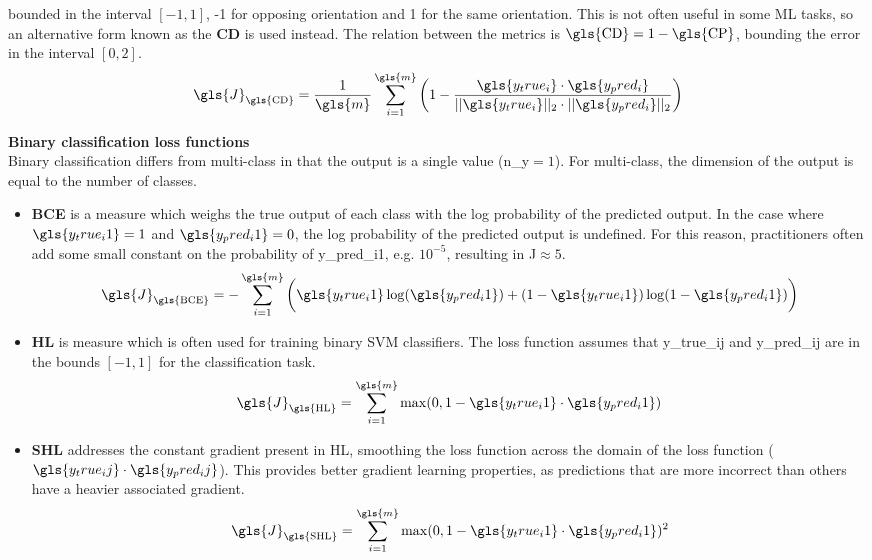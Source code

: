 \begin{itemize}
    bounded in the interval $[-1,1]$, -1 for opposing orientation and 1 for the
    same orientation. This is not often useful in some \gls{ML} tasks, so an
    alternative form known as the \textbf{\gls{CD}} is used instead. The
    relation between the metrics is $\text{\gls{CD}}=1-\text{\gls{CP}}$,
    bounding the error in the interval $[0,2]$.
    \begin{equation}
        \gls{J}_\text{\gls{CD}} =
        \frac{1}{\gls{m}}\sum_{i=1}^{\gls{m}}\bigg(1-\frac{\gls{y_true_i}\cdot{}\gls{y_pred_i}}{||\gls{y_true_i}||_2\cdot{}||\gls{y_pred_i}||_2}\bigg)
    \end{equation}
\end{itemize}

\textbf{Binary classification loss functions}\\
Binary classification differs from multi-class in that the output is a single
value (\gls{n_y}$=1$). For multi-class, the dimension of the output is equal to
the number of classes.

\begin{itemize}
    \item \textbf{\Gls{BCE}} is a measure which weighs the true output of each
    class with the log probability of the predicted output. In the case
    where $\gls{y_true_i1}=1$ and $\gls{y_pred_i1}=0$, the log probability of
    the predicted output is undefined. For this reason, practitioners often add
    some small constant on the probability of \gls{y_pred_i1}, e.g. $10^{-5}$,
    resulting in \gls{J}$\approx{}5$.
    \begin{equation}
        \gls{J}_\text{\gls{BCE}}=-\sum_{i=1}^{\gls{m}}\bigg(\gls{y_true_i1}\log(\gls{y_pred_i1})+(1-\gls{y_true_i1})\log(1-\gls{y_pred_i1})\bigg)\label{eq:equation}
    \end{equation}
    \item \textbf{\Gls{HL}} is measure which is often used for training binary
    \gls{SVM} classifiers. The loss function assumes that \gls{y_true_ij} and
    \gls{y_pred_ij} are in the bounds $[-1,1]$ for the classification task.
    \begin{equation}
        \gls{J}_\text{\gls{HL}}=\sum_{i=1}^{\gls{m}}\max(0, {1-\gls{y_true_i1}\cdot{}\gls{y_pred_i1}})
    \end{equation}
    \item \textbf{\Gls{SHL}} addresses the constant gradient present in
    \gls{HL}, smoothing the loss function across the domain of the loss function
    ($\gls{y_true_ij}\cdot{}\gls{y_pred_ij}$). This provides better gradient
    learning properties, as predictions that are more incorrect than others have
    a heavier associated gradient.
    \begin{equation}
        \gls{J}_\text{\gls{SHL}}=\sum_{i=1}^{\gls{m}}\max(0, {1-\gls{y_true_i1}\cdot{}\gls{y_pred_i1}})^2
    \end{equation}
\end{itemize}

